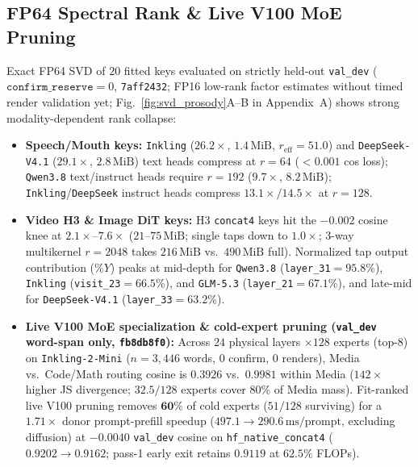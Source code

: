 \documentclass[10pt,twocolumn]{article}
\begin{document}
\subsection{FP64 Spectral Rank \& Live V100 MoE Pruning}
Exact FP64 SVD of $20$ fitted keys evaluated on strictly held-out \texttt{val\_dev} ($\texttt{confirm\_reserve}=0$, \texttt{7aff2432}; FP16 low-rank factor estimates without timed render validation yet; Fig.~\ref{fig:svd_prosody}A--B in Appendix~A) shows strong modality-dependent rank collapse:
\begin{itemize}[leftmargin=1.2em,itemsep=1.5pt]
\item \textbf{Speech/Mouth keys:} \texttt{Inkling} ($26.2\times$, $1.4\,\text{MiB}$, $r_{\text{eff}}=51.0$) and \texttt{DeepSeek-V4.1} ($29.1\times$, $2.8\,\text{MiB}$) text heads compress at $r=64$ ($<0.001$ cos loss); \texttt{Qwen3.8} text/instruct heads require $r=192$ ($9.7\times$, $8.2\,\text{MiB}$); \texttt{Inkling}/\texttt{DeepSeek} instruct heads compress $13.1\times/14.5\times$ at $r=128$.
\item \textbf{Video H3 \& Image DiT keys:} H3 \texttt{concat4} keys hit the $-0.002$ cosine knee at $2.1\times\text{--}7.6\times$ ($21\text{--}75\,\text{MiB}$; single taps down to $1.0\times$; 3-way multikernel $r=2048$ takes $216\,\text{MiB}$ vs.\ $490\,\text{MiB}$ full). Normalized tap output contribution ($\%Y$) peaks at mid-depth for \texttt{Qwen3.8} (\texttt{layer\_31}$=95.8\%$), \texttt{Inkling} (\texttt{visit\_23}$=66.5\%$), and \texttt{GLM-5.3} (\texttt{layer\_21}$=67.1\%$), and late-mid for \texttt{DeepSeek-V4.1} (\texttt{layer\_33}$=63.2\%$).
\item \textbf{Live V100 MoE specialization \& cold-expert pruning (\texttt{val\_dev} word-span only, \texttt{fb8db8f0}):} Across $24$ physical layers $\times 128$ experts (top-8) on \texttt{Inkling-2-Mini} ($n=3{,}446$ words, $0$ confirm, $0$ renders), Media vs.\ Code/Math routing cosine is $0.3926$ vs.\ $0.9981$ within Media ($142\times$ higher JS divergence; $32.5/128$ experts cover $80\%$ of Media mass). Fit-ranked live V100 pruning removes $\mathbf{60\%}$ of cold experts ($51/128$ surviving) for a $\mathbf{1.71\times}$ donor prompt-prefill speedup ($497.1 \to 290.6\,\text{ms/prompt}$, excluding diffusion) at $-0.0040$ \texttt{val\_dev} cosine on \texttt{hf\_native\_concat4} ($0.9202 \to 0.9162$; pass-1 early exit retains $0.9119$ at $62.5\%$ FLOPs).
\end{itemize}
\end{document}
